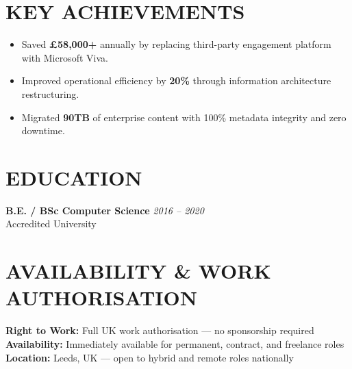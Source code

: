 \documentclass[11pt,a4paper]{article}
\begin{document}
\section*{KEY ACHIEVEMENTS}
\begin{itemize}
    \item Saved \textbf{\pounds58,000+} annually by replacing third-party engagement platform with Microsoft Viva.
    \item Improved operational efficiency by \textbf{20\%} through information architecture restructuring.
    \item Migrated \textbf{90TB} of enterprise content with 100\% metadata integrity and zero downtime.
\end{itemize}

\section*{EDUCATION}
\textbf{B.E. / BSc Computer Science} \hfill \textit{2016 -- 2020} \\
Accredited University

\section*{AVAILABILITY \& WORK AUTHORISATION}
\textbf{Right to Work:} Full UK work authorisation --- no sponsorship required \\
\textbf{Availability:} Immediately available for permanent, contract, and freelance roles \\
\textbf{Location:} Leeds, UK --- open to hybrid and remote roles nationally
\end{document}
